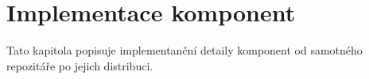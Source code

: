 \chapter{Implementace komponent}

Tato kapitola popisuje implementanční detaily komponent od samotného repozitáře po jejich distribuci.
